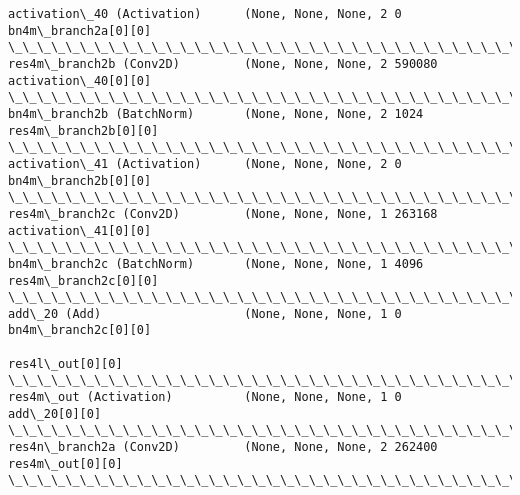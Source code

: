 \documentclass[11pt]{article}
\begin{document}
\begin{Verbatim}[commandchars=\\\{\}]
activation\_40 (Activation)      (None, None, None, 2 0           bn4m\_branch2a[0][0]              
\_\_\_\_\_\_\_\_\_\_\_\_\_\_\_\_\_\_\_\_\_\_\_\_\_\_\_\_\_\_\_\_\_\_\_\_\_\_\_\_\_\_\_\_\_\_\_\_\_\_\_\_\_\_\_\_\_\_\_\_\_\_\_\_\_\_\_\_\_\_\_\_\_\_\_\_\_\_\_\_\_\_\_\_\_\_\_\_\_\_\_\_\_\_\_\_\_\_
res4m\_branch2b (Conv2D)         (None, None, None, 2 590080      activation\_40[0][0]              
\_\_\_\_\_\_\_\_\_\_\_\_\_\_\_\_\_\_\_\_\_\_\_\_\_\_\_\_\_\_\_\_\_\_\_\_\_\_\_\_\_\_\_\_\_\_\_\_\_\_\_\_\_\_\_\_\_\_\_\_\_\_\_\_\_\_\_\_\_\_\_\_\_\_\_\_\_\_\_\_\_\_\_\_\_\_\_\_\_\_\_\_\_\_\_\_\_\_
bn4m\_branch2b (BatchNorm)       (None, None, None, 2 1024        res4m\_branch2b[0][0]             
\_\_\_\_\_\_\_\_\_\_\_\_\_\_\_\_\_\_\_\_\_\_\_\_\_\_\_\_\_\_\_\_\_\_\_\_\_\_\_\_\_\_\_\_\_\_\_\_\_\_\_\_\_\_\_\_\_\_\_\_\_\_\_\_\_\_\_\_\_\_\_\_\_\_\_\_\_\_\_\_\_\_\_\_\_\_\_\_\_\_\_\_\_\_\_\_\_\_
activation\_41 (Activation)      (None, None, None, 2 0           bn4m\_branch2b[0][0]              
\_\_\_\_\_\_\_\_\_\_\_\_\_\_\_\_\_\_\_\_\_\_\_\_\_\_\_\_\_\_\_\_\_\_\_\_\_\_\_\_\_\_\_\_\_\_\_\_\_\_\_\_\_\_\_\_\_\_\_\_\_\_\_\_\_\_\_\_\_\_\_\_\_\_\_\_\_\_\_\_\_\_\_\_\_\_\_\_\_\_\_\_\_\_\_\_\_\_
res4m\_branch2c (Conv2D)         (None, None, None, 1 263168      activation\_41[0][0]              
\_\_\_\_\_\_\_\_\_\_\_\_\_\_\_\_\_\_\_\_\_\_\_\_\_\_\_\_\_\_\_\_\_\_\_\_\_\_\_\_\_\_\_\_\_\_\_\_\_\_\_\_\_\_\_\_\_\_\_\_\_\_\_\_\_\_\_\_\_\_\_\_\_\_\_\_\_\_\_\_\_\_\_\_\_\_\_\_\_\_\_\_\_\_\_\_\_\_
bn4m\_branch2c (BatchNorm)       (None, None, None, 1 4096        res4m\_branch2c[0][0]             
\_\_\_\_\_\_\_\_\_\_\_\_\_\_\_\_\_\_\_\_\_\_\_\_\_\_\_\_\_\_\_\_\_\_\_\_\_\_\_\_\_\_\_\_\_\_\_\_\_\_\_\_\_\_\_\_\_\_\_\_\_\_\_\_\_\_\_\_\_\_\_\_\_\_\_\_\_\_\_\_\_\_\_\_\_\_\_\_\_\_\_\_\_\_\_\_\_\_
add\_20 (Add)                    (None, None, None, 1 0           bn4m\_branch2c[0][0]              
                                                                 res4l\_out[0][0]                  
\_\_\_\_\_\_\_\_\_\_\_\_\_\_\_\_\_\_\_\_\_\_\_\_\_\_\_\_\_\_\_\_\_\_\_\_\_\_\_\_\_\_\_\_\_\_\_\_\_\_\_\_\_\_\_\_\_\_\_\_\_\_\_\_\_\_\_\_\_\_\_\_\_\_\_\_\_\_\_\_\_\_\_\_\_\_\_\_\_\_\_\_\_\_\_\_\_\_
res4m\_out (Activation)          (None, None, None, 1 0           add\_20[0][0]                     
\_\_\_\_\_\_\_\_\_\_\_\_\_\_\_\_\_\_\_\_\_\_\_\_\_\_\_\_\_\_\_\_\_\_\_\_\_\_\_\_\_\_\_\_\_\_\_\_\_\_\_\_\_\_\_\_\_\_\_\_\_\_\_\_\_\_\_\_\_\_\_\_\_\_\_\_\_\_\_\_\_\_\_\_\_\_\_\_\_\_\_\_\_\_\_\_\_\_
res4n\_branch2a (Conv2D)         (None, None, None, 2 262400      res4m\_out[0][0]                  
\_\_\_\_\_\_\_\_\_\_\_\_\_\_\_\_\_\_\_\_\_\_\_\_\_\_\_\_\_\_\_\_\_\_\_\_\_\_\_\_\_\_\_\_\_\_\_\_\_\_\_\_\_\_\_\_\_\_\_\_\_\_\_\_\_\_\_\_\_\_\_\_\_\_\_\_\_\_\_\_\_\_\_\_\_\_\_\_\_\_\_\_\_\_\_\_\_\_

\end{Verbatim}
\end{document}
